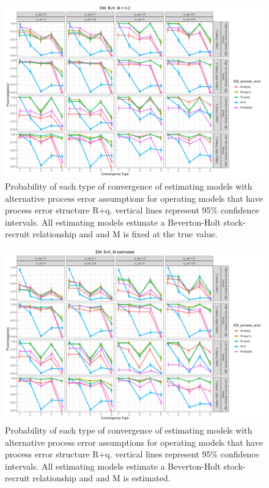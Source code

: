 \documentclass[
  12pt,
]{article}
\begin{document}
\begin{landscape}
\begin{figure}
\caption{Probability of each type of convergence of estimating models with alternative process error assumptions for operating models that have process error structure R+q. vertical lines represent 95\% confidence intervals. All estimating models estimate a Beverton-Holt stock-recruit relationship and and M is fixed at the true value.}\label{q_om_em_BH_MF_convergence}
\begin{center}
\includegraphics[width = \textwidth]{q_om_p_convergence_BH_M_fixed.png}
\end{center}
\end{figure}
\end{landscape}

\begin{landscape}
\begin{figure}
\caption{Probability of each type of convergence of estimating models with alternative process error assumptions for operating models that have process error structure R+q. vertical lines represent 95\% confidence intervals. All estimating models estimate a Beverton-Holt stock-recruit relationship and and M is estimated.}\label{q_om_em_BH_ME_convergence}
\begin{center}
\includegraphics[width = \textwidth]{q_om_p_convergence_BH_M_estimated.png}
\end{center}
\end{figure}
\end{landscape}
\end{document}
